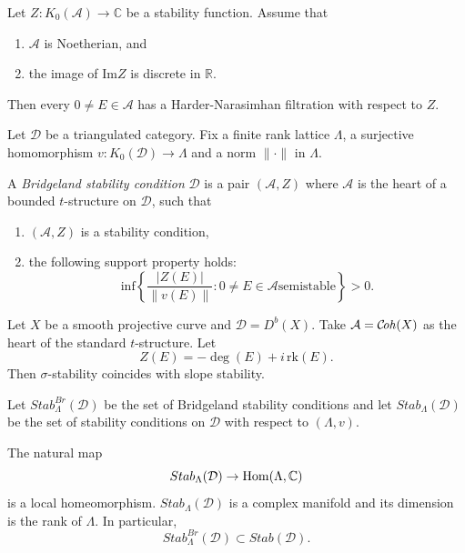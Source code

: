 \begin{lemma}
\label{lemma-harder-narasimhan-existence}
Let $Z:K_0(\mathcal{A})\to \mathbb{C}$
be a stability function.
Assume that
\begin{enumerate}
\item $\mathcal{A}$ is Noetherian, and
\item the image of $\text{Im}Z$
is discrete in $\mathbb{R}$.
\end{enumerate}
Then every $0 \neq E \in \mathcal{A}$
has a Harder-Narasimhan filtration
with respect to $Z$.
\end{lemma}

\noindent
Let $\mathcal{D}$ be a triangulated
category. Fix a finite rank lattice
$\Lambda$, a surjective homomorphism
$v:K_0(\mathcal{D}) \to \Lambda$
and a norm $\|\cdot\|$ in $\Lambda$.

\begin{definition}
\label{definition-bridgeland-stability}
A {\it Bridgeland stability condition}
$\mathcal{D}$ is a pair $(\mathcal{A},Z)$
where $\mathcal{A}$ is the heart of a
bounded $t$-structure on $\mathcal{D}$,
such that
\begin{enumerate}
\item $(\mathcal{A},Z)$ is a stability
condition,
\item the following support property
holds:
$$
\text{inf}\left\{
\frac{|Z(E)|}{
\|v(E)\|}
:0 \neq  E \in \mathcal{A}
\text{semistable}\right\}
>0.
$$
\end{enumerate}
\end{definition}

\begin{example}
\label{example-stability-curve}
Let $X$ be a smooth projective
curve and $\mathcal{D}=D^b(X)$.
Take $\mathcal{A}=\mathcal{C}\!\mathit{oh}(X)$ as the
heart of the standard
$t$-structure.
Let
$$
Z(E)=-\deg(E)+i\,\mathrm{rk}(E).
$$
Then $\sigma$-stability coincides
with slope stability.
\end{example}

\noindent
Let $Stab^{Br}_\Lambda(\mathcal{D})$
be the set of Bridgeland stability
conditions and let
$Stab_\Lambda(\mathcal{D})$ be the set
of stability conditions on $\mathcal{D}$
with respect to $(\Lambda,v)$.

\begin{theorem}[Bridgeland]
\label{theorem-bridgeland}
The natural map
$$
Stab_\Lambda(\mathcal{D})
\to \mathop{\mathrm{Hom}}\nolimits(\Lambda,\mathbb{C})
$$
is a local homeomorphism.
$Stab_\Lambda(\mathcal{D})$ is a complex
manifold and
its dimension is the rank of $\Lambda$.
In particular,
$$
Stab_\Lambda^{Br}(\mathcal{D})
\subset
Stab(\mathcal{D}).
$$
\end{theorem}

